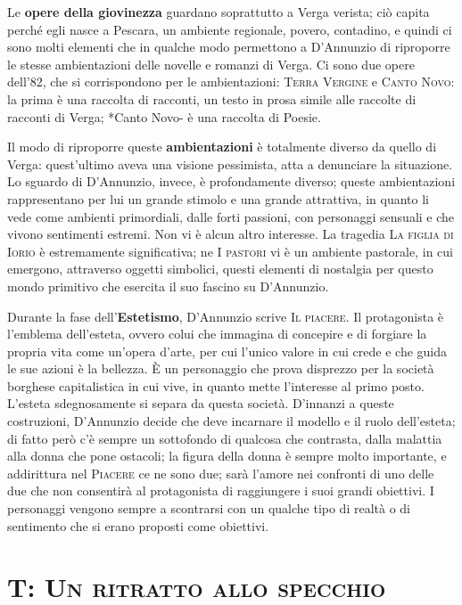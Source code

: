 \documentclass{book}
\newcommand{\evidenziatore}[1]{\textbf{#1}}
\begin{document}
Le \evidenziatore{opere della giovinezza} guardano soprattutto a Verga
verista; ciò capita perché egli nasce a Pescara, un ambiente regionale,
povero, contadino, e quindi ci sono molti elementi che in qualche modo
permettono a D'Annunzio di riproporre le stesse ambientazioni delle
novelle e romanzi di Verga. Ci sono due opere dell'82, che si
corrispondono per le ambientazioni: \textsc{Terra Vergine} e \textsc{Canto
Novo}: la prima è una raccolta di racconti, un testo in prosa simile
alle raccolte di racconti di Verga; *Canto Novo- è una raccolta di
Poesie.

Il modo di riproporre queste \evidenziatore{ambientazioni} è totalmente
diverso da quello di Verga: quest'ultimo aveva una visione pessimista,
atta a denunciare la situazione. Lo sguardo di D'Annunzio, invece, è
profondamente diverso; queste ambientazioni rappresentano per lui un
grande stimolo e una grande attrattiva, in quanto li vede come ambienti
primordiali, dalle forti passioni, con personaggi sensuali e che vivono
sentimenti estremi. Non vi è alcun altro interesse. La tragedia \textsc{La
figlia di Iorio} è estremamente significativa; ne \textsc{I pastori} vi è un
ambiente pastorale, in cui emergono, attraverso oggetti simbolici,
questi elementi di nostalgia per questo mondo primitivo che esercita il
suo fascino su D'Annunzio.

Durante la fase dell'\evidenziatore{Estetismo}, D'Annunzio scrive
\textsc{Il piacere}. Il protagonista è l'emblema dell'esteta, ovvero colui
che immagina di concepire e di forgiare la propria vita come un'opera
d'arte, per cui l'unico valore in cui crede e che guida le sue azioni è
la bellezza. È un personaggio che prova disprezzo per la società
borghese capitalistica in cui vive, in quanto mette l'interesse al primo
posto. L'esteta sdegnosamente si separa da questa società. D'innanzi a
queste costruzioni, D'Annunzio decide che deve incarnare il modello e il
ruolo dell'esteta; di fatto però c'è sempre un sottofondo di qualcosa
che contrasta, dalla malattia alla donna che pone ostacoli; la figura
della donna è sempre molto importante, e addirittura nel \textsc{Piacere}
ce ne sono due; sarà l'amore nei confronti di uno delle due che non
consentirà al protagonista di raggiungere i suoi grandi obiettivi. I
personaggi vengono sempre a scontrarsi con un qualche tipo di realtà o
di sentimento che si erano proposti come obiettivi.


\section{T: \textsc{Un ritratto allo specchio}}
\end{document}
